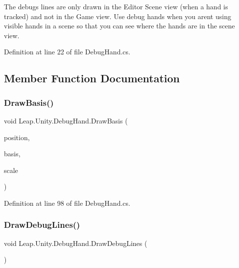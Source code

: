 The debugs lines are only drawn in the Editor Scene view (when a hand is tracked) and not in the Game view. Use debug hands when you aren\textquotesingle{}t using visible hands in a scene so that you can see where the hands are in the scene view. 

Definition at line 22 of file Debug\+Hand.\+cs.



\subsection{Member Function Documentation}
\mbox{\label{class_leap_1_1_unity_1_1_debug_hand_abb49cc3a3a3716e71a59c193fe7e58b1}} 
\subsubsection{\texorpdfstring{DrawBasis()}{DrawBasis()}}
{\footnotesize\ttfamily void Leap.\+Unity.\+Debug\+Hand.\+Draw\+Basis (\begin{DoxyParamCaption}\item[{\mbox{\hyperlink{struct_leap_1_1_vector}{Vector}}}]{position,  }\item[{\mbox{\hyperlink{struct_leap_1_1_leap_transform}{Leap\+Transform}}}]{basis,  }\item[{float}]{scale }\end{DoxyParamCaption})}



Definition at line 98 of file Debug\+Hand.\+cs.

\mbox{\label{class_leap_1_1_unity_1_1_debug_hand_a013b3eb2cdabba0ddcc7e38aa3ee3044}} 
\subsubsection{\texorpdfstring{DrawDebugLines()}{DrawDebugLines()}}
{\footnotesize\ttfamily void Leap.\+Unity.\+Debug\+Hand.\+Draw\+Debug\+Lines (\begin{DoxyParamCaption}{ }\end{DoxyParamCaption})\hspace{0.3cm}{\ttfamily [protected]}}

